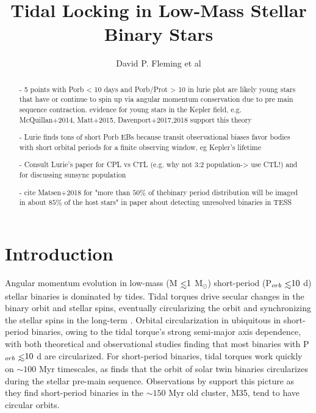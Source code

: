 \documentclass[twocolumn]{aastex61}
\def\lsim{~\rlap{$<$}{\lower 1.0ex\hbox{$\sim$}}}
\begin{document}
\title{Tidal Locking in Low-Mass Stellar Binary Stars}



\author{David P. Fleming et al}


\begin{abstract}

- 5 points with Porb < 10 days and Porb/Prot > 10 in lurie plot are likely young stars that have or continue to spin up via angular momentum conservation due to pre main sequence contraction.  evidence for young stars in the Kepler field, e.g. McQuillan+2014, Matt+2015, Davenport+2017,2018 support this theory

- Lurie finds tons of short Porb EBs because transit observational biases favor bodies with short orbital periods for a finite observing window, eg Kepler's lifetime 

- Consult Lurie's paper for CPL vs CTL (e.g. why not 3:2 population-> use CTL!) and for discussing sunsync population

- cite Matsen+2018 for "more than $50\%$ of thebinary period distribution will be imaged in about $85\%$ of the host stars" in paper
about detecting unresolved binaries in TESS

\end{abstract}




\section{Introduction} \label{sec:intro}

Angular momentum evolution in low-mass (M$\lsim 1$ M$_{\odot}$) short-period (P$_{orb} \lsim 10$ d) stellar binaries is dominated by tides.  Tidal torques drive secular changes in the binary orbit and stellar spins, eventually circularizing the orbit and synchronizing the stellar spins in the long-term \citep{Counselman1973}. Orbital circularization in ubiquitous in short-period binaries, owing to the tidal torque's strong semi-major axis dependence, with both theoretical \citep[e.g.][]{Zahn1989} and observational \citep[e.g.][]{Meibom2005,Mazeh2008,Lurie2017} studies finding that most binaries with P$_{orb} \lsim 10$ d are circularized. For short-period binaries, tidal torques work quickly on ${\sim}100$ Myr timescales, as \citet{Zahn1989} finds that the orbit of solar twin binaries circularizes during the stellar pre-main sequence.  Observations by \citet{Meibom2005} support this picture as they find short-period binaries in the ${\sim}150$ Myr old cluster, M35, tend to have circular orbits.
\end{document}
